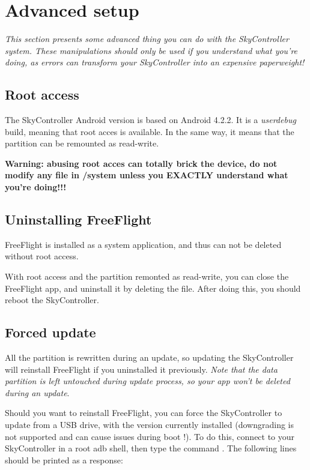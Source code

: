 \section{Advanced setup}

\textit{This section presents some advanced thing you can do with the SkyController system. These manipulations should only be used if you understand what you're doing, as errors can transform your SkyController into an expensive paperweight!}

\subsection{Root access}

The SkyController Android version is based on Android 4.2.2. It is a \textit{userdebug} build, meaning that root acces is available. In the same way, it means that the  partition can be remounted as read-write.

\textbf{Warning: abusing root acces can totally brick the device, do not modify any file in /system unless you EXACTLY understand what you're doing!!!}

\subsection{Uninstalling FreeFlight}

FreeFlight is installed as a system application, and thus can not be deleted without root access.

With root access and the  partition remonted as read-write, you can close the FreeFlight app, and uninstall it by deleting the  file. After doing this, you should reboot the SkyController.

\subsection{Forced update}

All the  partition is rewritten during an update, so updating the SkyController will reinstall FreeFlight if you uninstalled it previously. \emph{Note that the data partition is left untouched during update process, so your app won't be deleted during an update}.

Should you want to reinstall FreeFlight, you can force the SkyController to update from a USB drive, with the version currently installed (downgrading is not supported and can cause issues during boot !). To do this, connect to your SkyController in a root adb shell, then type the command . The following lines should be printed as a response:

